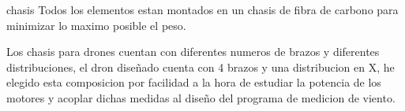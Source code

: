 
chasis
Todos los elementos estan montados en un chasis de fibra de carbono para minimizar lo maximo posible el peso.
                
                Los chasis para drones cuentan con diferentes numeros de brazos y diferentes distribuciones, el dron diseñado cuenta con 4 brazos y una distribucion en X, he elegido esta composicion por facilidad a la hora de estudiar la potencia de los motores y acoplar dichas medidas al diseño del programa de medicion de viento.
